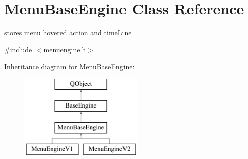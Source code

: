 \hypertarget{class_menu_base_engine}{}\section{Menu\+Base\+Engine Class Reference}
\label{class_menu_base_engine}


stores menu hovered action and time\+Line  




{\ttfamily \#include $<$menuengine.\+h$>$}

Inheritance diagram for Menu\+Base\+Engine\+:\begin{figure}[H]
\begin{center}
\leavevmode
\includegraphics[height=4.000000cm]{class_menu_base_engine}
\end{center}
\end{figure}
